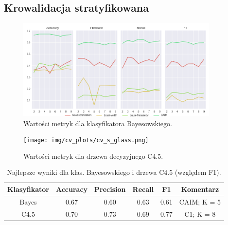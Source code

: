 \subsection*{Krowalidacja stratyfikowana}

\begin{figure}[H]
\center
    \includegraphics[width=0.9\textwidth]{img/cv_scores_stratifiedkfold/scoring_stratifiedkfold_glass.png}
    \caption{Wartości metryk dla klasyfikatora Bayesowskiego.}
\end{figure}

\begin{figure}[H]
    \center
    \texttt{[image: img/cv\_plots/cv\_s\_glass.png]}
    \caption{Wartości metryk dla drzewa decyzyjnego C4.5.}
\end{figure}


\begin{table}[H]
  \center
  \begin{tabular}{|c|c|c|c|c|c|}
    \hline
    Klasyfikator & Accuracy & Precision & Recall & F1 & Komentarz \\ \hline
    Bayes        & 0.67     & 0.60      & 0.63   & 0.61 & CAIM; K = 5 \\ \hline
    C4.5         & 0.70     & 0.73      & 0.69   & 0.77 & C1; K = 8 \\ \hline
  \end{tabular}

  \caption{Najlepsze wyniki dla klas. Bayesowskiego i drzewa C4.5 (względem F1).}
\end{table}

